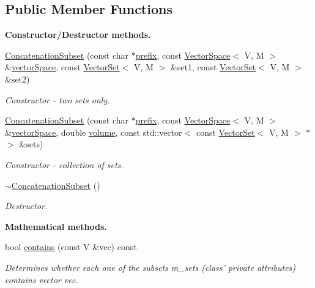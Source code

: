 \subsection*{Public Member Functions}
\begin{Indent}{\bf Constructor/\-Destructor methods.}\par
\begin{DoxyCompactItemize}
\item 
\hyperlink{class_q_u_e_s_o_1_1_concatenation_subset_a40e562bd1f4f050b46316751ed2fd068}{Concatenation\-Subset} (const char $\ast$\hyperlink{class_q_u_e_s_o_1_1_vector_set_aedcd4b0f502af4c6e6df863c13cddfec}{prefix}, const \hyperlink{class_q_u_e_s_o_1_1_vector_space}{Vector\-Space}$<$ V, M $>$ \&\hyperlink{class_q_u_e_s_o_1_1_vector_subset_afc859b5206bc056c66893c854c191959}{vector\-Space}, const \hyperlink{class_q_u_e_s_o_1_1_vector_set}{Vector\-Set}$<$ V, M $>$ \&set1, const \hyperlink{class_q_u_e_s_o_1_1_vector_set}{Vector\-Set}$<$ V, M $>$ \&set2)
\begin{DoxyCompactList}\small\item\em Constructor -\/ two sets only. \end{DoxyCompactList}\item 
\hyperlink{class_q_u_e_s_o_1_1_concatenation_subset_a102c4976236346467b86ea632bb0f658}{Concatenation\-Subset} (const char $\ast$\hyperlink{class_q_u_e_s_o_1_1_vector_set_aedcd4b0f502af4c6e6df863c13cddfec}{prefix}, const \hyperlink{class_q_u_e_s_o_1_1_vector_space}{Vector\-Space}$<$ V, M $>$ \&\hyperlink{class_q_u_e_s_o_1_1_vector_subset_afc859b5206bc056c66893c854c191959}{vector\-Space}, double \hyperlink{class_q_u_e_s_o_1_1_vector_set_a3266f16e2672f5f3c929f22df085e545}{volume}, const std\-::vector$<$ const \hyperlink{class_q_u_e_s_o_1_1_vector_set}{Vector\-Set}$<$ V, M $>$ $\ast$ $>$ \&sets)
\begin{DoxyCompactList}\small\item\em Constructor -\/ collection of sets. \end{DoxyCompactList}\item 
\hyperlink{class_q_u_e_s_o_1_1_concatenation_subset_acfed3d69fbce44b59e6f3f0c7c9ad93e}{$\sim$\-Concatenation\-Subset} ()
\begin{DoxyCompactList}\small\item\em Destructor. \end{DoxyCompactList}\end{DoxyCompactItemize}
\end{Indent}
\begin{Indent}{\bf Mathematical methods.}\par
\begin{DoxyCompactItemize}
\item 
bool \hyperlink{class_q_u_e_s_o_1_1_concatenation_subset_a6d69cad4ff5b5a622357bb27ac5678a0}{contains} (const V \&vec) const 
\begin{DoxyCompactList}\small\item\em Determines whether each one of the subsets m\-\_\-sets (class' private attributes) contains vector {\ttfamily vec}. \end{DoxyCompactList}\end{DoxyCompactItemize}
\end{Indent}
